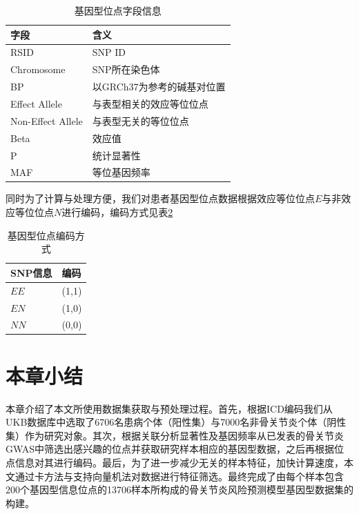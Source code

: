 \begin{table}[!h]
	\renewcommand{\arraystretch}{1.2}
	\centering\wuhao
	\caption{基因型位点字段信息} \label{SNP_traits} \vspace{2mm}
	\begin{tabularx}{\textwidth} { 
   >{\centering\arraybackslash}X 
   >{\centering\arraybackslash}X }
	\toprule[1.5pt]
		字段 & 含义                \\
	\midrule[1pt]
		RSID              & SNP ID            \\
    Chromosome        & SNP所在染色体          \\
    BP                & 以GRCh37为参考的碱基对位置  \\
    Effect Allele     & 与表型相关的效应等位位点        \\
    Non-Effect Allele & 与表型无关的等位位点        \\
    Beta              & 效应值               \\
    P                 & 统计显著性             \\
    MAF               & 等位基因频率           \\
	\bottomrule[1.5pt]
	\end{tabularx}
\end{table}

同时为了计算与处理方便，我们对患者基因型位点数据根据效应等位位点$E$与非效应等位位点$N$进行编码，编码方式见表\ref{SNP_encoding}

\begin{table}[!h]
	\renewcommand{\arraystretch}{1.2}
	\centering\wuhao
	\caption{基因型位点编码方式} \label{SNP_encoding} \vspace{2mm}
	\begin{tabularx}{\textwidth} { 
   >{\centering\arraybackslash}X 
   >{\centering\arraybackslash}X }
	\toprule[1.5pt]
		SNP信息 & 编码\\
	\midrule[1pt]
	    $EE$ & (1,1) \\
	    $EN$ & (1,0) \\
	    $NN$ & (0,0) \\
	\bottomrule[1.5pt]
	\end{tabularx}
\end{table}

\section{本章小结}
本章介绍了本文所使用数据集获取与预处理过程。首先，根据ICD编码我们从UKB数据库中选取了6706名患病个体（阳性集）与7000名非骨关节炎个体（阴性集）作为研究对象。其次，根据关联分析显著性及基因频率从已发表的骨关节炎GWAS中筛选出感兴趣的位点并获取研究样本相应的基因型数据，之后再根据位点信息对其进行编码。最后，为了进一步减少无关的样本特征，加快计算速度，本文通过卡方法与支持向量机法对数据进行特征筛选。最终完成了由每个样本包含200个基因型信息位点的13706样本所构成的骨关节炎风险预测模型基因型数据集的构建。